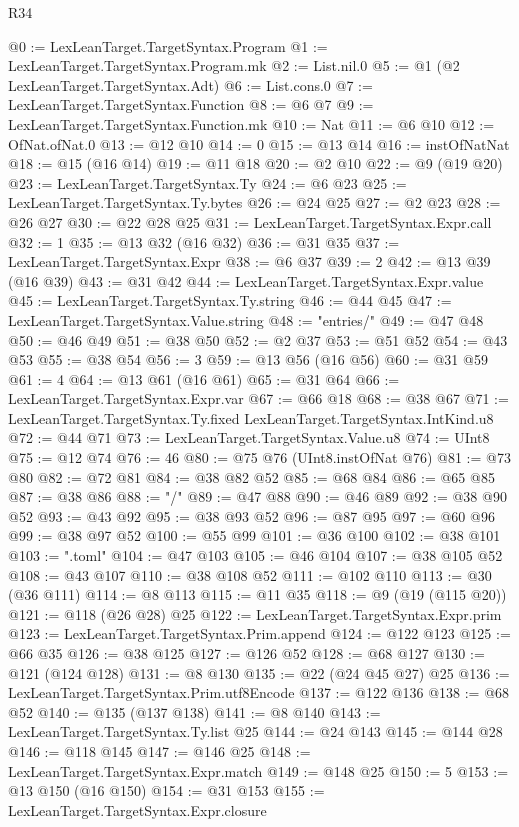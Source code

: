 \begin{lexlean}{R34}
\begin{coremodule}
@0 := LexLeanTarget.TargetSyntax.Program
@1 := LexLeanTarget.TargetSyntax.Program.mk
@2 := List.nil.{0}
@5 := @1 (@2 LexLeanTarget.TargetSyntax.Adt)
@6 := List.cons.{0}
@7 := LexLeanTarget.TargetSyntax.Function
@8 := @6 @7
@9 := LexLeanTarget.TargetSyntax.Function.mk
@10 := Nat
@11 := @6 @10
@12 := OfNat.ofNat.{0}
@13 := @12 @10
@14 := 0
@15 := @13 @14
@16 := instOfNatNat
@18 := @15 (@16 @14)
@19 := @11 @18
@20 := @2 @10
@22 := @9 (@19 @20)
@23 := LexLeanTarget.TargetSyntax.Ty
@24 := @6 @23
@25 := LexLeanTarget.TargetSyntax.Ty.bytes
@26 := @24 @25
@27 := @2 @23
@28 := @26 @27
@30 := @22 @28 @25
@31 := LexLeanTarget.TargetSyntax.Expr.call
@32 := 1
@35 := @13 @32 (@16 @32)
@36 := @31 @35
@37 := LexLeanTarget.TargetSyntax.Expr
@38 := @6 @37
@39 := 2
@42 := @13 @39 (@16 @39)
@43 := @31 @42
@44 := LexLeanTarget.TargetSyntax.Expr.value
@45 := LexLeanTarget.TargetSyntax.Ty.string
@46 := @44 @45
@47 := LexLeanTarget.TargetSyntax.Value.string
@48 := "entries/"
@49 := @47 @48
@50 := @46 @49
@51 := @38 @50
@52 := @2 @37
@53 := @51 @52
@54 := @43 @53
@55 := @38 @54
@56 := 3
@59 := @13 @56 (@16 @56)
@60 := @31 @59
@61 := 4
@64 := @13 @61 (@16 @61)
@65 := @31 @64
@66 := LexLeanTarget.TargetSyntax.Expr.var
@67 := @66 @18
@68 := @38 @67
@71 := LexLeanTarget.TargetSyntax.Ty.fixed LexLeanTarget.TargetSyntax.IntKind.u8
@72 := @44 @71
@73 := LexLeanTarget.TargetSyntax.Value.u8
@74 := UInt8
@75 := @12 @74
@76 := 46
@80 := @75 @76 (UInt8.instOfNat @76)
@81 := @73 @80
@82 := @72 @81
@84 := @38 @82 @52
@85 := @68 @84
@86 := @65 @85
@87 := @38 @86
@88 := "/"
@89 := @47 @88
@90 := @46 @89
@92 := @38 @90 @52
@93 := @43 @92
@95 := @38 @93 @52
@96 := @87 @95
@97 := @60 @96
@99 := @38 @97 @52
@100 := @55 @99
@101 := @36 @100
@102 := @38 @101
@103 := ".toml"
@104 := @47 @103
@105 := @46 @104
@107 := @38 @105 @52
@108 := @43 @107
@110 := @38 @108 @52
@111 := @102 @110
@113 := @30 (@36 @111)
@114 := @8 @113
@115 := @11 @35
@118 := @9 (@19 (@115 @20))
@121 := @118 (@26 @28) @25
@122 := LexLeanTarget.TargetSyntax.Expr.prim
@123 := LexLeanTarget.TargetSyntax.Prim.append
@124 := @122 @123
@125 := @66 @35
@126 := @38 @125
@127 := @126 @52
@128 := @68 @127
@130 := @121 (@124 @128)
@131 := @8 @130
@135 := @22 (@24 @45 @27) @25
@136 := LexLeanTarget.TargetSyntax.Prim.utf8Encode
@137 := @122 @136
@138 := @68 @52
@140 := @135 (@137 @138)
@141 := @8 @140
@143 := LexLeanTarget.TargetSyntax.Ty.list @25
@144 := @24 @143
@145 := @144 @28
@146 := @118 @145
@147 := @146 @25
@148 := LexLeanTarget.TargetSyntax.Expr.match
@149 := @148 @25
@150 := 5
@153 := @13 @150 (@16 @150)
@154 := @31 @153
@155 := LexLeanTarget.TargetSyntax.Expr.closure

\end{coremodule}
\end{lexlean}
